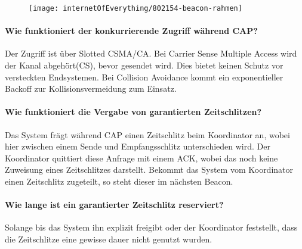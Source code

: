 	\begin{figure}[H]
		\centering
		\texttt{[image: internetOfEverything/802154-beacon-rahmen]}
\end{figure}			

	\paragraph{Wie funktioniert der konkurrierende Zugriff während CAP?}
	Der Zugriff ist über Slotted CSMA/CA.
	Bei Carrier Sense Multiple Access wird der Kanal abgehört(CS), bevor gesendet wird. Dies bietet keinen Schutz vor versteckten Endsystemen. Bei Collision Avoidance kommt ein exponentieller Backoff zur Kollisionsvermeidung zum Einsatz.  
	
	\paragraph{Wie funktioniert die Vergabe von garantierten Zeitschlitzen?}
	Das System frägt während CAP einen Zeitschlitz beim Koordinator an, wobei hier zwischen einem Sende und Empfangsschlitz unterschieden wird. Der Koordinator quittiert diese Anfrage mit einem ACK, wobei das noch keine Zuweisung eines Zeitschlitzes darstellt. Bekommt das System vom Koordinator einen Zeitschlitz zugeteilt, so steht dieser im nächsten Beacon.
	
	\paragraph{Wie lange ist ein garantierter Zeitschlitz reserviert?}
	Solange bis das System ihn explizit freigibt oder der Koordinator feststellt, dass die Zeitschlitze eine gewisse dauer nicht genutzt wurden.
	
